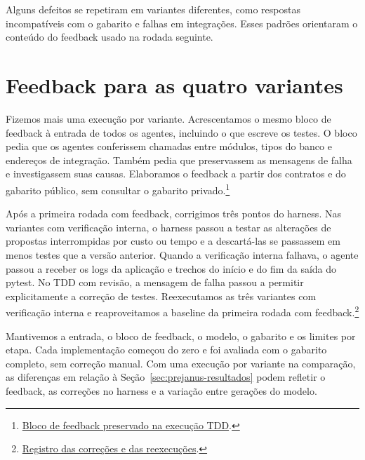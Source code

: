 \documentclass[a4paper,12pt,twoside,english,brazilian]{book}
\begin{document}
Alguns defeitos se repetiram em variantes diferentes, como respostas
incompatíveis com o gabarito e falhas em integrações. Esses padrões
orientaram o conteúdo do feedback usado na rodada seguinte.

\section{Feedback para as quatro variantes}
\label{sec:prejanus-licoes}

Fizemos mais uma execução por variante. Acrescentamos o mesmo bloco
de feedback à entrada de todos os agentes, incluindo o que escreve os
testes. O bloco pedia que os agentes conferissem chamadas entre módulos,
tipos do banco e endereços de integração. Também pedia que preservassem
as mensagens de falha e investigassem suas causas. Elaboramos o feedback
a partir dos contratos e do gabarito público, sem consultar o gabarito
privado.\footnote{\href{https://github.com/Educg550/tcc/blob/70b2b101616ce53456cc62f0acbb25297d1bcb3d/demos/runs/caronte/05-prejanus-back-piloto-v3-licoes-tdd-20261125-162401/_harness/entrada/licoes.md}{Bloco de feedback preservado na execução TDD}.}

Após a primeira rodada com feedback, corrigimos três pontos do harness.
Nas variantes com verificação interna, o harness passou a testar as
alterações de propostas interrompidas por custo ou tempo e a descartá-las
se passassem em menos testes que a versão anterior. Quando a verificação
interna falhava, o agente passou a receber os logs da aplicação e trechos
do início e do fim da saída do pytest. No TDD com revisão, a mensagem de
falha passou a permitir explicitamente a correção de testes.
Reexecutamos as três variantes com verificação interna e reaproveitamos a
baseline da primeira rodada com feedback.\footnote{\href{https://github.com/Educg550/tcc/blob/70b2b101616ce53456cc62f0acbb25297d1bcb3d/blog/2026-11-25-runs-com-licoes-refeitas.md}{Registro das correções e das reexecuções}.}

Mantivemos a entrada, o bloco de feedback, o modelo, o gabarito e os limites
por etapa. Cada implementação começou do zero e foi avaliada com o gabarito
completo, sem correção manual. Com uma execução por variante na comparação,
as diferenças em relação à Seção~\ref{sec:prejanus-resultados} podem refletir
o feedback, as correções no harness e a variação entre gerações do modelo.

\end{document}
